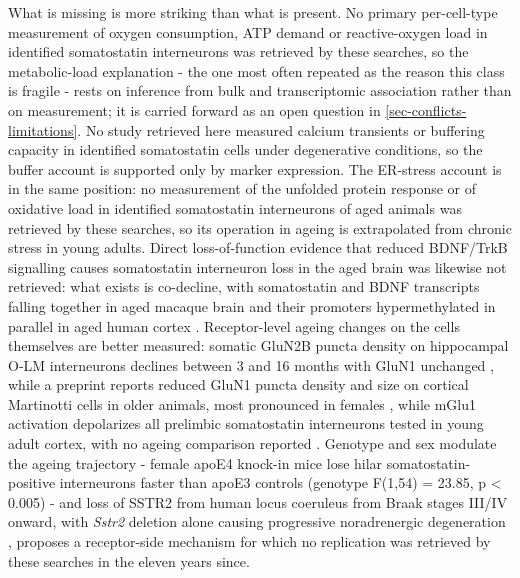\documentclass[11pt]{article}
\begin{document}
What is missing is more striking than what is present. No primary per-cell-type measurement of oxygen consumption, ATP demand or reactive-oxygen load in identified somatostatin interneurons was retrieved by these searches, so the metabolic-load explanation - the one most often repeated as the reason this class is fragile - rests on inference from bulk and transcriptomic association rather than on measurement; it is carried forward as an open question in \ref{sec-conflicts-limitations}. No study retrieved here measured calcium transients or buffering capacity in identified somatostatin cells under degenerative conditions, so the buffer account is supported only by marker expression. The ER-stress account is in the same position: no measurement of the unfolded protein response or of oxidative load in identified somatostatin interneurons of aged animals was retrieved by these searches, so its operation in ageing is extrapolated from chronic stress in young adults. Direct loss-of-function evidence that reduced BDNF/TrkB signalling causes somatostatin interneuron loss in the aged brain was likewise not retrieved: what exists is co-decline, with somatostatin and BDNF transcripts falling together in aged macaque brain \citep{Hayashi1997} and their promoters hypermethylated in parallel in aged human cortex \citep{McKinney2015}. Receptor-level ageing changes on the cells themselves are better measured: somatic GluN2B puncta density on hippocampal O-LM interneurons declines between 3 and 16 months with GluN1 unchanged \citep{Gramuntell2021}, while a preprint reports reduced GluN1 puncta density and size on cortical Martinotti cells in older animals, most pronounced in females \citep{SanchezMoreno2025}, while mGlu1 activation depolarizes all prelimbic somatostatin interneurons tested in young adult cortex, with no ageing comparison reported \citep{Maksymetz2021}. Genotype and sex modulate the ageing trajectory - female apoE4 knock-in mice lose hilar somatostatin-positive interneurons faster than apoE3 controls (genotype F(1,54) = 23.85, p < 0.005) \citep{Leung2012} - and loss of SSTR2 from human locus coeruleus from Braak stages III/IV onward, with \emph{Sstr2} deletion alone causing progressive noradrenergic degeneration \citep{Adori2015}, proposes a receptor-side mechanism for which no replication was retrieved by these searches in the eleven years since.
\end{document}
